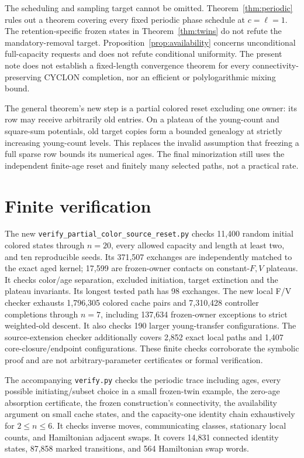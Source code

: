 \documentclass[11pt]{article}
\begin{document}
The scheduling and sampling target cannot be omitted.
Theorem~\ref{thm:periodic} rules out a theorem covering every fixed
periodic phase schedule at $c=\ell=1$.
The retention-specific frozen states in Theorem~\ref{thm:twins}
do not refute the mandatory-removal target.
Proposition~\ref{prop:availability} concerns unconditional
full-capacity requests and does not refute conditional uniformity.
The present note does not establish a fixed-length convergence
theorem for every connectivity-preserving CYCLON completion,
nor an efficient or polylogarithmic mixing bound.

The general theorem's new step is a partial colored reset excluding
one owner: its row may receive arbitrarily old entries. On a plateau
of the young-count and square-sum potentials, old target copies form
a bounded genealogy at strictly increasing young-count levels. This
replaces the invalid assumption that freezing a full sparse row bounds
its numerical ages. The final minorization still uses the independent
finite-age reset and finitely many selected paths, not a practical rate.

\section{Finite verification}
The new \texttt{verify\_partial\_color\_source\_reset.py} checks
11,400 random initial colored states through $n=20$, every allowed
capacity and length at least two, and ten reproducible seeds. Its
371,507 exchanges are independently matched to the exact aged kernel;
17,599 are frozen-owner contacts on constant-$F,V$ plateaus. It checks
color/age separation, excluded initiation, target extinction and the
plateau invariants. Its longest tested path has 98 exchanges. The new local F/V checker exhausts 1,796,305 colored cache pairs and
7,310,428 controller completions through $n=7$, including 137,634
frozen-owner exceptions to strict weighted-old descent. It also checks
190 larger young-transfer configurations. The
source-extension checker additionally covers 2,852 exact local paths
and 1,407 core-closure/endpoint configurations. These finite checks
corroborate the symbolic proof and are not arbitrary-parameter
certificates or formal verification.

The accompanying \texttt{verify.py} checks the periodic trace including
ages, every possible initiating/subset choice in a small frozen-twin
example, the zero-age absorption certificate, the frozen construction's connectivity, the availability
argument on small cache states, and the capacity-one identity chain
exhaustively for $2\le n\le6$. It checks inverse moves, communicating
classes, stationary local counts, and Hamiltonian adjacent swaps.
It covers 14,831 connected identity states, 87,858 marked transitions,
and 564 Hamiltonian swap words.
\end{document}
